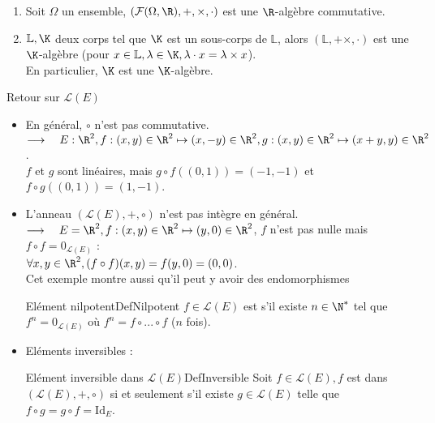 \documentclass[12pt, a4paper]{report}
\begin{document}
\begin{remarque}{}
\begin{exemple}{}
\begin{enumerate}
	\item Soit $\Omega$ un ensemble, $(\mathcal{F}(\Omega,\R),+,\times,\cdot)$ est une $\R$-algèbre commutative. 
	
	\item $\mathbb{L}, \K$ deux corps tel que $\K$ est un sous-corps de $\mathbb{L}$, alors $(\mathbb{L}, + \times, \cdot)$ est une $\K$-algèbre (pour $x \in \mathbb{L}, \lambda \in \K, \lambda \cdot x  = \lambda \times x$). \\
	En particulier, $\K$ est une $\K$-algèbre.
\end{enumerate}
\end{exemple}
\end{remarque}

\begin{application}{Retour sur $\mathcal{L}(E)$}{}
\begin{itemize}
	\item En général, $\circ$ n'est pas commutative. \\
	$\longrightarrow \quad E : \R^2, f : (x,y) \in \R^2 \mapsto (x,-y) \in \R^2, g : (x,y) \in \R^2 \mapsto (x+y,y) \in \R^2$. \\
	$f$ et $g$ sont linéaires, mais $g \circ f ((0,1)) = (-1,-1)$ et $f \circ g((0,1)) = (1,-1)$.
	
	\item L'anneau $(\mathcal{L}(E), +, \circ)$ n'est pas intègre en général. \\
	$\longrightarrow \quad E = \R^2, f : (x,y) \in \R^2 \mapsto (y,0) \in \R^2$, \; $f$ n'est pas nulle mais $f \circ f = 0_{\mathcal{L}(E)}$ : \\
	$\forall x,y \in \R^2, (f \circ f)(x,y) = f(y,0) = (0,0)$. \\
	Cet exemple montre aussi qu'il peut y avoir des endomorphismes 
	
	\begin{definition}{Elément nilpotent}{DefNilpotent}
	$f \in \mathcal{L}(E)$ est  s'il existe $n \in \N^*$ tel que $f^n = 0_{\mathcal{L}(E)}$ où $f^n = f \circ ... \circ f$ ($n$ fois).
	\end{definition}
	
	\item Eléments inversibles :
	\begin{definition}{Elément inversible dans $\mathcal{L}(E)$}{DefInversible}
	Soit $f \in \mathcal{L}(E), f$ est  dans $(\mathcal{L}(E), +, \circ)$ si et seulement s'il existe $g \in \mathcal{L}(E)$ telle que $f \circ g = g \circ f = \text{Id}_{E}$.
	\end{definition}
	

\end{itemize}
\end{application}
\end{document}
